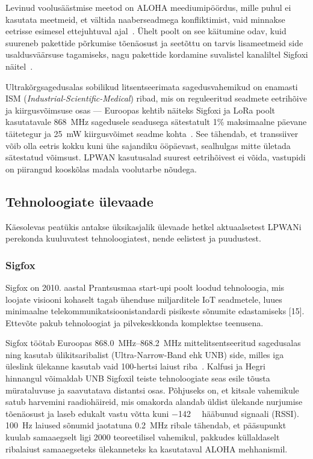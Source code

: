 \documentclass[12pt]{article}
\begin{document}
    Levinud voolusäästmise meetod on ALOHA meediumipöördus, mille puhul ei kasutata meetmeid, et vältida naaberseadmega konfliktimist, vaid minnakse eetrisse esimesel ettejuhtuval ajal~\cite{raza}.
    Ühelt poolt on see käitumine odav, kuid suureneb pakettide põrkumise tõenäosust ja seetõttu on tarvis lisameetmeid side usaldusväärsuse tagamiseks, nagu pakettide kordamine suvalistel kanaliltel Sigfoxi näitel~\cite{raza}.

    Ultrakõrgsagedusalas sobilikud litsentseerimata sagedusvahemikud on enamasti ISM (\textit{Industrial-Scientific-Medical}) ribad, mis on reguleeritud seadmete eetrihõive ja kiirgusvõimsuse osas — Euroopas kehtib näiteks Sigfoxi ja LoRa poolt kasutatavale \SI{868}{\mega\hertz} sagedusele seadusega sätestatult 1\% maksimaalne päevane täitetegur ja \SI{25}{\milli\watt} kiirgusvõimet seadme kohta~\cite{etsi}.
    See tähendab, et transsiiver võib olla eetris kokku kuni ühe sajandiku ööpäevast, sealhulgas mitte ületada sätestatud võimsust.
    LPWAN kasutusalad suurest eetrihõivest ei võida, vastupidi on piirangud kooskõlas madala voolutarbe nõudega.

    \subsection{Tehnoloogiate ülevaade}

    Käesolevas peatükis antakse üksikasjalik ülevaade hetkel aktuaalsetest LPWANi perekonda kuuluvatest tehnoloogiatest, nende eelistest ja puudustest.

    \subsubsection{Sigfox}

    Sigfox on 2010. aastal Prantsusmaa start-upi poolt loodud tehnoloogia, mis loojate visiooni kohaselt tagab ühenduse miljarditele IoT seadmetele, luues minimaalne telekommunikatsioonistandardi pisikeste sõnumite edastamiseks [15].
    Ettevõte pakub tehnoloogiat ja pilvekeskkonda komplektse teenusena.

    Sigfox töötab Euroopas \SIrange{868.0}{868.2}{\mega\hertz} mittelitsentseeritud sagedusalas ning kasutab ülikitsaribalist (Ultra-Narrow-Band ehk UNB) side, milles iga üleslink ülekanne kasutab vaid 100-hertsi laiust riba~\cite{sigfoxtech}.
    Kalfusi ja Hegri~\cite{kalfus2016ultra} hinnangul võimaldab UNB Sigfoxil teiste tehnoloogiate seas esile tõusta mürataluvuse ja saavutatava distantsi osas.
    Põhjuseks on, et kitsale vahemikule satub harvemini raadiohäireid, mis omakorda alandab üldist ülekande nurjumise tõenäosust ja laseb edukalt vastu võtta kuni \SI{-142}{\deci\belm} hääbunud signaali (RSSI).
    \SI{100}{\hertz} laiused sõnumid jaotatuna \SI{0,2}{\mega\hertz} ribale tähendab, et pääsupunkt kuulab samaaegselt ligi 2000 teoreetilisel vahemikul, pakkudes küllaldaselt ribalaiust samaaegseteks ülekanneteks ka kasutataval ALOHA mehhanismil.
\end{document}
